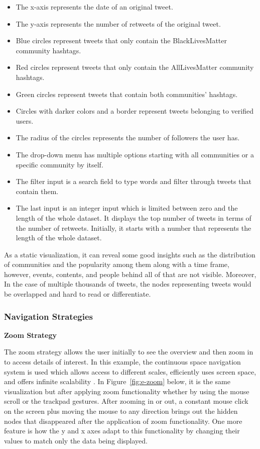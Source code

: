 \begin{itemize}
    \item The x-axis represents the date of an original tweet.  
    \item The y-axis represents the number of retweets of the original tweet.
    \item Blue circles represent tweets that only contain the BlackLivesMatter community hashtags.
    \item Red circles represent tweets that only contain the AllLivesMatter community hashtags.
    \item Green circles represent tweets that contain both communities' hashtags.
    \item Circles with darker colors and a border represent tweets belonging to verified users.
    \item The radius of the circles represents the number of followers the user has.
    \item The drop-down menu has multiple options starting with all communities or a specific community by itself.
    \item The filter input is a search field to type words and filter through tweets that contain them.
    \item The last input is an integer input which is limited between zero and the length of the whole dataset. It displays the top number of tweets in terms of the number of retweets. Initially, it starts with a number that represents the length of the whole dataset.  
\end{itemize}

As a static visualization, it can reveal some good insights such as the distribution of communities and the popularity among them along with a time frame, however, events, contents, and people behind all of that are not visible. Moreover, In the case of multiple thousands of tweets, the nodes representing tweets would be overlapped and hard to read or differentiate.  

\subsubsection{Navigation Strategies}

\textbf{Zoom Strategy}

The zoom strategy allows the user initially to see the overview and then zoom in to access details of interest. In this example, the continuous space navigation system is used which allows access to different scales, efficiently uses screen space, and offers infinite scalability \cite{bederson1994pad++, johnson1999tree}. In Figure~\ref{fig:e-zoom} below, it is the same visualization but after applying zoom functionality whether by using the mouse scroll or the trackpad gestures. After zooming in or out, a constant mouse click on the screen plus moving the mouse to any direction brings out the hidden nodes that disappeared after the application of zoom functionality. One more feature is how the y and x axes adapt to this functionality by changing their values to match only the data being displayed.  


